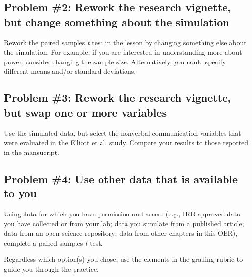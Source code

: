 \documentclass[
  11pt,
]{book}
\begin{document}
\hypertarget{problem-2-rework-the-research-vignette-but-change-something-about-the-simulation-2}{%
\subsection{Problem \#2: Rework the research vignette, but change something about the simulation}\label{problem-2-rework-the-research-vignette-but-change-something-about-the-simulation-2}}

Rework the paired samples \emph{t} test in the lesson by changing something else about the simulation. For example, if you are interested in understanding more about power, consider changing the sample size. Alternatively, you could specify different means and/or standard deviations.

\hypertarget{problem-3-rework-the-research-vignette-but-swap-one-or-more-variables-1}{%
\subsection{Problem \#3: Rework the research vignette, but swap one or more variables}\label{problem-3-rework-the-research-vignette-but-swap-one-or-more-variables-1}}

Use the simulated data, but select the nonverbal communication variables that were evaluated in the Elliott et al. \citeyearpar{elliott_differences_2016}study. Compare your results to those reported in the mansucript.

\hypertarget{problem-4-use-other-data-that-is-available-to-you-1}{%
\subsection{Problem \#4: Use other data that is available to you}\label{problem-4-use-other-data-that-is-available-to-you-1}}

Using data for which you have permission and access (e.g., IRB approved data you have collected or from your lab; data you simulate from a published article; data from an open science repository; data from other chapters in this OER), complete a paired samples \emph{t} test.

Regardless which option(s) you chose, use the elements in the grading rubric to guide you through the practice.
\end{document}
